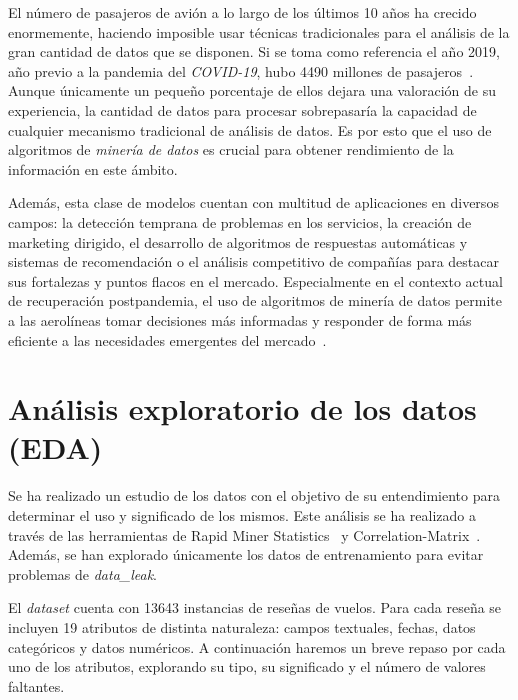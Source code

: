 \documentclass[es]{uc3mreport}
\begin{document}
\begin{report}
El número de pasajeros de avión a lo largo de los últimos 10 años ha crecido
enormemente, haciendo imposible usar técnicas tradicionales para el análisis de
la gran cantidad de datos que se disponen. Si se toma como referencia el año
2019, año previo a la pandemia del \textit{COVID-19}, hubo 4490 millones de
pasajeros~\cite{owd-passengers}. Aunque únicamente un pequeño porcentaje de
ellos dejara una valoración de su experiencia, la cantidad de datos para
procesar sobrepasaría la capacidad de cualquier mecanismo tradicional de
análisis de datos. Es por esto que el uso de algoritmos de \textit{minería de datos} es crucial para obtener rendimiento de la información en este ámbito.

Además, esta clase de modelos cuentan con multitud de aplicaciones en diversos campos: la detección temprana de problemas en los servicios, la creación de marketing dirigido, el desarrollo de algoritmos de respuestas automáticas y sistemas de recomendación o el análisis competitivo de compañías para destacar sus fortalezas y puntos flacos en el mercado. Especialmente en el contexto actual de recuperación postpandemia, el uso de algoritmos de minería de datos permite a las aerolíneas tomar decisiones más informadas y responder de forma más eficiente a las necesidades emergentes del mercado~\cite{espanna}.

\section{Análisis exploratorio de los datos (EDA)}
\label{chap:eda}
Se ha realizado un estudio de los datos con el objetivo de su entendimiento para determinar el uso y significado de los mismos. Este análisis se ha realizado a través de las herramientas de Rapid Miner Statistics~\cite{Statistics-RM} y Correlation-Matrix~\cite{Correlation-Matrix-RM}. Además, se han explorado únicamente los datos de entrenamiento para evitar problemas de \textit{data\_leak}.

El \textit{dataset} cuenta con 13643 instancias de reseñas de vuelos. Para cada reseña se incluyen 19 atributos de distinta naturaleza: campos textuales, fechas, datos categóricos y datos numéricos. A continuación haremos un breve repaso por cada uno de los atributos, explorando su tipo, su significado y el número de valores faltantes.


\end{report}
\end{document}
